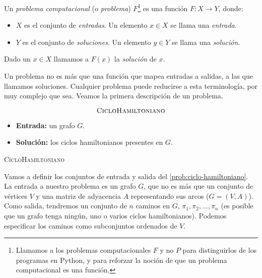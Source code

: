 \begin{definicion}\label{def:problema-computacional}
Un \emph{problema computacional} (o \emph{problema}) $F$\footnote{Llamamos a los problemas computacionales $F$ y no $P$ para distinguirlos de los programas en Python, y para reforzar la noción de que un problema computacional es una función.} es una función $F:X \longrightarrow Y$, donde:
\begin{itemize}
    \item $X$ es el conjunto de \emph{entradas}. Un elemento $x\in X$ se llama una \emph{entrada}.
    \item $Y$ es el conjunto de \emph{soluciones}. Un elemento $y\in Y$ se llama una \emph{solución}.
\end{itemize}

Dado un $x\in X$ llamamos a $F(x)$ la \emph{solución} de $x$.
\end{definicion}

Un problema no es más que una función que mapea entradas a salidas, a las que llamamos soluciones. Cualquier problema puede reducirse a esta terminología, por muy complejo que sea. Veamos la primera descripción de un problema.

\begin{problema}
\begin{framed}
$$\text{\textsc{CicloHamiltoniano}}$$

\begin{itemize}
    \item \textbf{Entrada:} un grafo $G$.
    \item \textbf{Solución:} los ciclos hamiltonianos presentes en $G$.
\end{itemize}
\end{framed}
\caption{\textsc{CicloHamiltoniano}}
\label{prob:ciclo-hamiltoniano}
\end{problema}

Vamos a definir los conjuntos de entrada y salida del \cref{prob:ciclo-hamiltoniano}. La entrada a nuestro problema es un grafo $G$, que no es más que un conjunto de vértices $V$ y una matriz de adyacencia $A$ representando sus arcos ($G=(V,A)$). Como salida, tendremos un conjunto de $n$ caminos en $G$, $\pi_1,\pi_2,...,\pi_n$ (es posible que un grafo tenga ningún, uno o varios ciclos hamiltonianos). Podemos especificar los caminos como subconjuntos ordenados de $V$.

